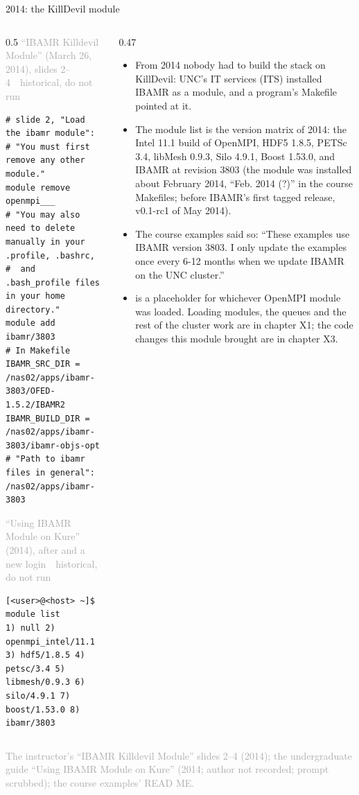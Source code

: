 \documentclass[aspectratio=169,11pt]{beamer}
\newcommand{\sourcecredit}[1]{\vfill\begin{flushright}\tiny\textcolor{DarkGray}{#1}\end{flushright}}
\newcommand{\hist}[1]{{\tiny\sffamily\textcolor{DarkGray}{#1\ \textbullet\ historical, do not run}}\par\nointerlineskip\vspace{0.3mm}}
\begin{document}
\begin{frame}[fragile]{2014: the KillDevil module }
\label{fr:m3803}
\begin{columns}[T,onlytextwidth]
\begin{column}{0.5\textwidth}
\hist{``IBAMR Killdevil Module'' (March 26, 2014), slides 2--4}
\begin{lstlisting}[style=hist]
# slide 2, "Load the ibamr module":
# "You must first remove any other module."
module remove openmpi___
# "You may also need to delete manually in your .profile, .bashrc,
#  and .bash_profile files in your home directory."
module add ibamr/3803
# In Makefile
IBAMR_SRC_DIR = /nas02/apps/ibamr-3803/OFED-1.5.2/IBAMR2
IBAMR_BUILD_DIR = /nas02/apps/ibamr-3803/ibamr-objs-opt
# "Path to ibamr files in general": /nas02/apps/ibamr-3803
\end{lstlisting}
\hist{``Using IBAMR Module on Kure'' (2014), after \code{module initadd ibamr/3803} and a new login}
\begin{lstlisting}[style=hist]
[<user>@<host> ~]$ module list
1) null 2) openmpi_intel/11.1 3) hdf5/1.8.5 4) petsc/3.4 5) libmesh/0.9.3 6) silo/4.9.1 7) boost/1.53.0 8) ibamr/3803
\end{lstlisting}
\end{column}
\begin{column}{0.47\textwidth}
\scriptsize
\begin{itemize}\setlength{\itemsep}{2pt}
  \item From 2014 nobody had to build the stack on KillDevil: UNC's IT services (ITS) installed IBAMR as a module, and a program's Makefile pointed at it.
  \item The module list is the version matrix of 2014: the Intel 11.1 build of OpenMPI, HDF5 1.8.5, PETSc 3.4, libMesh 0.9.3, Silo 4.9.1, Boost 1.53.0, and IBAMR at revision 3803 (the module was installed about February 2014, ``Feb. 2014 (?)'' in the course Makefiles; before IBAMR's first tagged release, v0.1-rc1 of May 2014).
  \item The course examples said so: ``These examples use IBAMR version 3803. I only update the examples once every 6-12 months when we update IBAMR on the UNC cluster.''
  \item {} is a placeholder for whichever OpenMPI module was loaded. Loading modules, the queues and the rest of the cluster work are in chapter X1; the code changes this module brought are in chapter X3.
\end{itemize}
\end{column}
\end{columns}
\sourcecredit{The instructor's ``IBAMR Killdevil Module'' slides 2--4 (2014); the undergraduate guide ``Using IBAMR Module on Kure'' (2014; author not recorded; prompt scrubbed); the course examples' READ ME.}
\end{frame}
\end{document}
